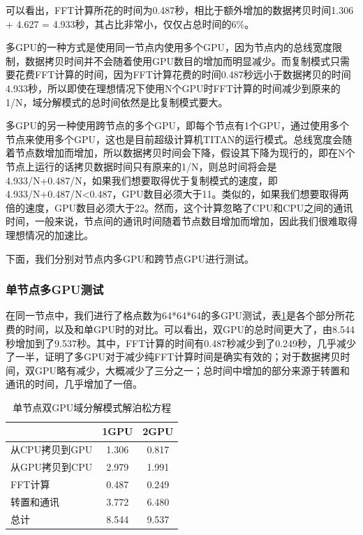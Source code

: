 可以看出，FFT计算所花的时间为0.487秒，相比于额外增加的数据拷贝时间1.306 + 4.627 = 4.933秒，其占比非常小，仅仅占总时间的6\%。

多GPU的一种方式是使用同一节点内使用多个GPU，因为节点内的总线宽度限制，数据拷贝时间并不会随着使用GPU数目的增加而明显减少。而复制模式只需要花费FFT计算的时间，因为FFT计算花费的时间0.487秒远小于数据拷贝的时间4.933秒，所以即使在理想情况下使用N个GPU时FFT计算的时间减少到原来的1/N，域分解模式的总时间依然是比复制模式要大。

多GPU的另一种使用跨节点的多个GPU，即每个节点有1个GPU，通过使用多个节点来使用多个GPU，这也是目前超级计算机TITAN的运行模式。总线宽度会随着节点数增加而增加，所以数据拷贝时间会下降，假设其下降为现行的，即在N个节点上运行的话拷贝数据时间只有原来的1/N，则总时间将会是4.933/N+0.487/N，如果我们想要取得优于复制模式的速度，即4.933/N+0.487/N<0.487，GPU数目必须大于11。类似的，如果我们想要取得两倍的速度，GPU数目必须大于22。然而，这个计算忽略了CPU和CPU之间的通讯时间，一般来说，节点间的通讯时间随着节点数目增加而增加，因此我们很难取得理想情况的加速比。

下面，我们分别对节点内多GPU和跨节点GPU进行测试。

\subsubsection{单节点多GPU测试}
在同一节点中，我们进行了格点数为64*64*64的多GPU测试，表\ref{tab:2GPU_Poisson}是各个部分所花费的时间，以及和单GPU时的对比。可以看出，双GPU的总时间更大了，由8.544秒增加到了9.537秒。其中，FFT计算的时间有0.487秒减少到了0.249秒，几乎减少了一半，证明了多GPU对于减少纯FFT计算时间是确实有效的；对于数据拷贝时间，双GPU略有减少，大概减少了三分之一；总时间中增加的部分来源于转置和通讯的时间，几乎增加了一倍。
\begin{table}[!htbp]
    \centering
    \footnotesize%
    \setlength{\tabcolsep}{4pt}%
    \renewcommand{\arraystretch}{1.2}%
    \begin{tabular}{lcc}
        \hline\hline
                          & 1GPU    & 2GPU   \\
        \hline\hline
        从CPU拷贝到GPU    & 1.306   & 0.817  \\
        \hline
        从GPU拷贝到CPU    & 2.979   & 1.991  \\
        \hline
        FFT计算           & 0.487   & 0.249  \\
        \hline
        转置和通讯        & 3.772   & 6.480  \\
        \hline
        总计              & 8.544   & 9.537  \\
        \hline\hline
    \end{tabular}
    \caption{单节点双GPU域分解模式解泊松方程}
    \label{tab:2GPU_Poisson}
\end{table}

